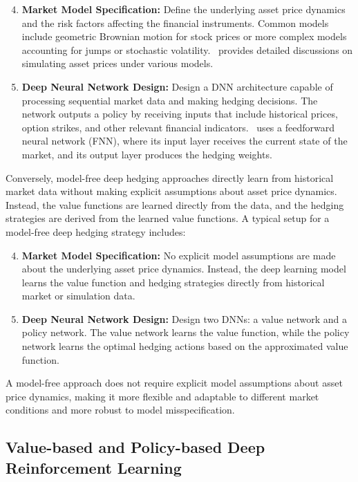 \begin{enumerate}[label=\arabic*a.]
    \setcounter{enumi}{3}
    \item \textbf{Market Model Specification:} Define the underlying asset price dynamics and the risk factors affecting the financial instruments. Common models include geometric Brownian motion for stock prices or more complex models accounting for jumps or stochastic volatility.~\cite{glasserman2004monte} provides detailed discussions on simulating asset prices under various models.
    \item \textbf{Deep Neural Network Design:} Design a DNN architecture capable of processing sequential market data and making hedging decisions. The network outputs a policy by receiving inputs that include historical prices, option strikes, and other relevant financial indicators.~\cite{buehler2019deep} uses a feedforward neural network (FNN), where its input layer receives the current state of the market, and its output layer produces the hedging weights.
\end{enumerate}

Conversely, model-free deep hedging approaches directly learn from historical market data without making explicit assumptions about asset price dynamics. 
Instead, the value functions are learned directly from the data, and the hedging strategies are derived from the learned value functions.
A typical setup for a model-free deep hedging strategy includes:

\begin{enumerate}[label=\arabic*b.]
    \setcounter{enumi}{3}
    \item \textbf{Market Model Specification:} No explicit model assumptions are made about the underlying asset price dynamics. Instead, the deep learning model learns the value function and hedging strategies directly from historical market or simulation data.
    \item \textbf{Deep Neural Network Design:} Design two DNNs: a value network and a policy network. The value network learns the value function, while the policy network learns the optimal hedging actions based on the approximated value function.
\end{enumerate}

A model-free approach does not require explicit model assumptions about asset price dynamics, making it more flexible and adaptable to different market conditions and more robust to model misspecification.

\subsection{Value-based and Policy-based Deep Reinforcement Learning}

